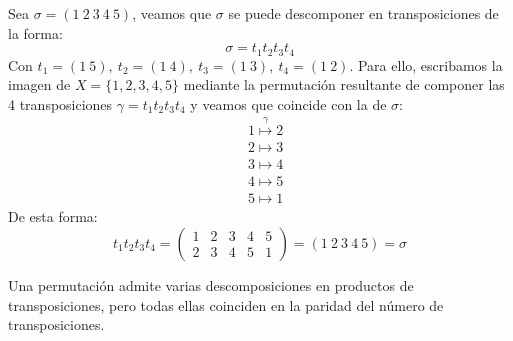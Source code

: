 \begin{ejemplo}
    Sea $\sigma = (1\ 2\ 3\ 4\ 5)$, veamos que $\sigma$ se puede descomponer en transposiciones de la forma:
    \begin{equation*}
        \sigma= t_1t_2t_3t_4
    \end{equation*}
    Con $t_1 = (1\ 5),\  t_2 = (1\ 4),\  t_3 = (1\ 3),\  t_4 = (1\ 2)$.\newline
    Para ello, escribamos la imagen de $X=\{1,2,3,4,5\}$ mediante la permutación resultante de componer las 4 transposiciones $\gamma=t_1t_2t_3t_4$ y veamos que coincide con la de $\sigma$:
    \begin{align*}
        &1 \stackrel{\gamma}{\longmapsto} 2 \\
        &2 \longmapsto 3 \\
        &3 \longmapsto 4 \\
        &4 \longmapsto 5 \\
        &5 \longmapsto 1 
    \end{align*}
    De esta forma:
    \begin{equation*}
        t_1t_2t_3t_4 = \left(\begin{array}{ccccc}
            1 & 2 & 3 & 4 & 5 \\
            2 & 3 & 4 & 5 & 1 
        \end{array}\right) = (1\ 2\ 3\ 4\ 5) = \sigma
    \end{equation*}
\end{ejemplo}

\begin{prop}
    Una permutación admite varias descomposiciones en productos de transposiciones, pero todas ellas coinciden en la paridad del número de transposiciones.
\end{prop}

